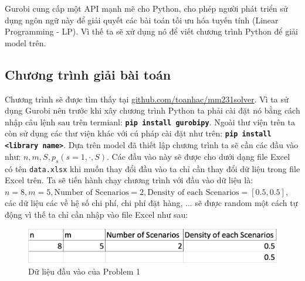 \documentclass[a4paper]{article}
\begin{document}
     Gurobi cung cấp một API mạnh mẽ cho Python, cho phép người phát triển sử dụng ngôn ngữ này để giải quyết các bài toán tối ưu hóa tuyến tính (Linear Programming - LP). Vì thế ta sẽ xử dụng nó để viết chương trình Python để giải model trên.



     
       

	\subsection{Chương trình giải bài toán}
    Chương trình sẽ được tìm thấy tại \href{github.com/toanhac/mm231solver}{github.com/toanhac/mm231solver}. Vì ta sử dụng Gurobi nên trước khi xây chương trình Python ta phải cài đặt nó bằng cách nhập câu lệnh sau trên termianl: \textbf{\texttt{pip install gurobipy}}. Ngoài thư viện trên ta còn sử dụng các thư viện khác với cú pháp cài đặt như trên: \textbf{\texttt{pip install <library name>}}. Dựa trên model đã thiết lập chương trình ta sẽ cần các đầu vào như: $n,m,S,p_s(s=1,\cdot,S)$. Các đầu vào này sẽ được cho dưới dạng file Excel có tên \texttt{data.xlsx} khi muốn thay đổi đầu vào ta chỉ cần thay đổi dữ liệu trong file Excel trên. Ta sẽ tiến hành chạy chương trình với đầu vào dữ liệu là: $n=8, m=5, \text{Number of Scenarios}=2, \text{Density of each Scenarios} = [0.5,0.5]$, các dữ liệu các về hệ số chi phí, chi phí đặt hàng, ... sẽ được random một cách tự động vì thế ta chỉ cần nhập vào file Excel như sau:
    \begin{figure}[h]
	\captionsetup{justification=centering}
	\centering
	\includegraphics[width=1\textwidth]{Images/p1Input.png}
	\caption{Dữ liệu đầu vào của Problem 1}
    \end{figure}
    
\end{document}
